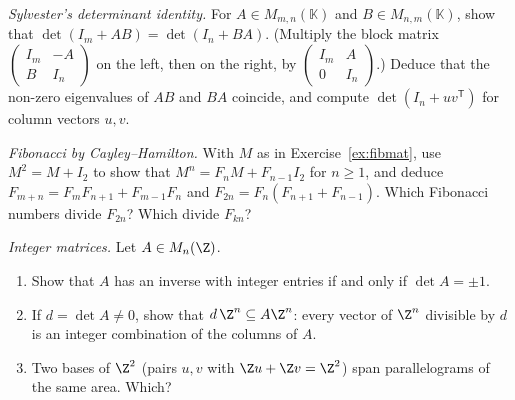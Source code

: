 \begin{exercise}[$\star\star$]\label{ex:sylvester}
\emph{Sylvester's determinant identity.} For $A\in M_{m,n}(\mathbb K)$ and $B\in M_{n,m}(\mathbb K)$, show that $\det(I_m+AB)=\det(I_n+BA)$. (Multiply the block matrix $\begin{pmatrix}I_m&-A\\B&I_n\end{pmatrix}$ on the left, then on the right, by $\begin{pmatrix}I_m&A\\0&I_n\end{pmatrix}$.) Deduce that the non-zero eigenvalues of $AB$ and $BA$ coincide, and compute $\det(I_n+uv^{\mathsf T})$ for column vectors $u,v$.
\end{exercise}

\begin{exercise}[$\star$]\label{ex:fibch}
\emph{Fibonacci by Cayley--Hamilton.} With $M$ as in Exercise~\ref{ex:fibmat}, use $M^2=M+I_2$ to show that $M^n=F_nM+F_{n-1}I_2$ for $n\ge1$, and deduce $F_{m+n}=F_mF_{n+1}+F_{m-1}F_n$ and $F_{2n}=F_n(F_{n+1}+F_{n-1})$. Which Fibonacci numbers divide $F_{2n}$? Which divide $F_{kn}$?
\end{exercise}

\begin{exercise}[$\star\star$]\label{ex:intinverse}
\emph{Integer matrices.} Let $A\in M_n(\Z)$.
\begin{enumerate}[label=(\alph*)]
\item Show that $A$ has an inverse with integer entries if and only if $\det A=\pm1$.
\item If $d=\det A\ne0$, show that $d\,\Z^n\subseteq A\Z^n$: every vector of $\Z^n$ divisible by $d$ is an integer combination of the columns of $A$.
\item Two bases of $\Z^2$ (pairs $u,v$ with $\Z u+\Z v=\Z^2$) span parallelograms of the same area. Which?
\end{enumerate}
\end{exercise}

